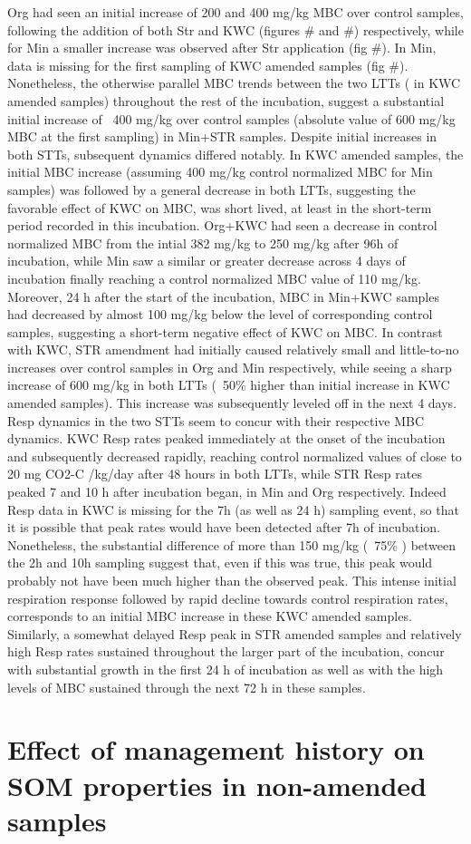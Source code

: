             Org had seen an initial increase of \midtilde{}200 and \midtilde{}400 mg/kg MBC over control samples, following the addition of both Str and KWC (figures # and #) respectively, while for Min a smaller increase was observed after Str application (fig #). In Min, data is missing for the first sampling of KWC  amended samples (fig #). Nonetheless, the otherwise parallel MBC trends between the two LTTs ( in KWC amended samples) throughout the rest of the incubation, suggest a substantial initial increase of ~400 mg/kg over control samples (absolute value of 600 mg/kg MBC at the first sampling)  in Min+STR samples. 
            Despite initial increases in both STTs, subsequent dynamics differed notably. In KWC amended samples, the initial MBC increase (assuming 400 mg/kg control normalized MBC for Min samples) was followed by a general decrease in both LTTs, suggesting the favorable effect of KWC on MBC,  was short lived, at least in the short-term period recorded in this incubation. Org+KWC had seen a decrease in control normalized MBC from the intial 382 mg/kg to 250 mg/kg after 96h of incubation, while Min saw a similar or greater decrease across 4 days of incubation finally reaching a control normalized MBC value of  110 mg/kg. Moreover, 24 h after the start of the incubation, MBC in Min+KWC samples had decreased by almost 100 mg/kg below the level of corresponding control samples,  suggesting a short-term negative effect of KWC on MBC. In contrast with KWC, STR amendment had initially caused relatively small and little-to-no increases over control samples in Org and Min respectively, while seeing a sharp increase of 600 mg/kg in both LTTs (~50$\%$ higher than initial increase in KWC amended samples). This increase was subsequently leveled off in the next 4 days. 
            Resp dynamics in the two STTs seem to concur with their respective MBC dynamics. KWC Resp rates peaked immediately at the onset of the incubation and subsequently decreased rapidly, reaching control normalized values of close to 20 mg CO2-C /kg/day after 48 hours in both LTTs, while STR Resp rates peaked 7 and 10 h after incubation began, in Min and Org respectively. Indeed Resp data in KWC is missing for the 7h (as well as 24 h) sampling event, so that it is possible that peak rates would have been detected after 7h of incubation. Nonetheless, the substantial difference of more than 150 mg/kg (~75$\%$ ) between the 2h and 10h sampling suggest that, even if this was true, this peak would probably not have been much higher than the observed peak. This intense initial respiration response followed by rapid decline towards control respiration rates, corresponds  to an initial MBC increase in these KWC amended samples. Similarly, a somewhat delayed Resp peak in STR amended samples and relatively high Resp rates sustained throughout the larger part of the incubation, concur with substantial growth in the first 24 h of incubation as well as with the high levels of MBC sustained through the next 72 h in these samples.      

    
\section{Effect of management history on SOM properties in non-amended samples}
   
